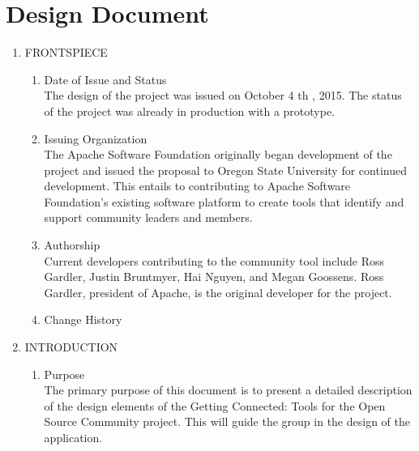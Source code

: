 \documentclass[draftclsnofoot,10pt,onecolumn]{IEEEtran} %
\begin{document}
\section{Design Document}

\begin{enumerate}
\item FRONTSPIECE \\
	\begin{enumerate}
	
		\item Date of Issue and Status \\
		The design of the project was issued on October 4 th , 2015. The status of the project was already in production with a
		prototype.\\
		
		\item Issuing Organization \\
		The Apache Software Foundation originally began development of the project and issued the proposal to Oregon
		State University for continued development. This entails to contributing to Apache Software Foundation’s existing
		software platform to create tools that identify and support community leaders and members.\\
		
		\item Authorship \\
		Current developers contributing to the community tool include Ross Gardler, Justin Bruntmyer, Hai Nguyen, and
		Megan Goossens. Ross Gardler, president of Apache, is the original developer for the project.\\
		
		\item Change History \\
		
	\end{enumerate}
	
\item INTRODUCTION \\
	\begin{enumerate}
	
		\item Purpose \\
		The primary purpose of this document is to present a detailed description of the design elements of the Getting
		Connected: Tools for the Open Source Community project. This will guide the group in the design of the
		application.\\
		

\end{enumerate}
\end{enumerate}
\end{document}
